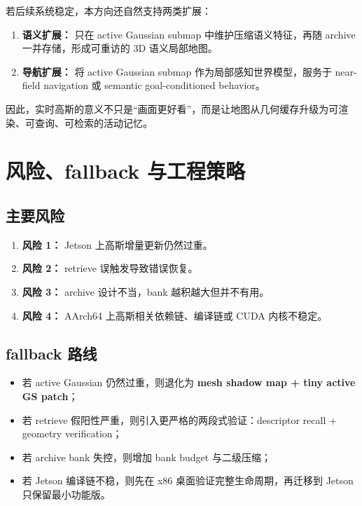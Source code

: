 \documentclass[12pt]{article}
\begin{document}
若后续系统稳定，本方向还自然支持两类扩展：
\begin{enumerate}
  \item \textbf{语义扩展：} 只在 active Gaussian submap 中维护压缩语义特征，再随 archive 一并存储，形成可重访的 3D 语义局部地图。
  \item \textbf{导航扩展：} 将 active Gaussian submap 作为局部感知世界模型，服务于 near-field navigation 或 semantic goal-conditioned behavior。
\end{enumerate}

因此，实时高斯的意义不只是“画面更好看”，而是让地图从几何缓存升级为可渲染、可查询、可检索的活动记忆。

\section{风险、fallback 与工程策略}

\subsection{主要风险}

\begin{enumerate}
  \item \textbf{风险 1：} Jetson 上高斯增量更新仍然过重。
  \item \textbf{风险 2：} retrieve 误触发导致错误恢复。
  \item \textbf{风险 3：} archive 设计不当，bank 越积越大但并不有用。
  \item \textbf{风险 4：} AArch64 上高斯相关依赖链、编译链或 CUDA 内核不稳定。
\end{enumerate}

\subsection{fallback 路线}

\begin{itemize}
  \item 若 active Gaussian 仍然过重，则退化为 \textbf{mesh shadow map + tiny active GS patch}；
  \item 若 retrieve 假阳性严重，则引入更严格的两段式验证：descriptor recall + geometry verification；
  \item 若 archive bank 失控，则增加 bank budget 与二级压缩；
  \item 若 Jetson 编译链不稳，则先在 x86 桌面验证完整生命周期，再迁移到 Jetson 只保留最小功能版。
\end{itemize}
\end{document}
